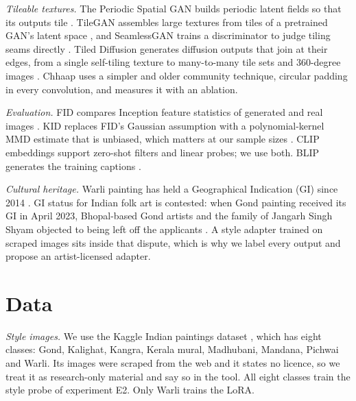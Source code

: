 \documentclass[conference]{IEEEtran}
\begin{document}
\textit{Tileable textures.} The Periodic Spatial GAN builds periodic latent fields so that its outputs tile \cite{bergmann2017psgan}. TileGAN assembles large textures from tiles of a pretrained GAN's latent space \cite{fruhstuck2019tilegan}, and SeamlessGAN trains a discriminator to judge tiling seams directly \cite{rodriguezpardo2022seamlessgan}. Tiled Diffusion generates diffusion outputs that join at their edges, from a single self-tiling texture to many-to-many tile sets and 360-degree images \cite{madar2025tiled}. Chhaap uses a simpler and older community technique, circular padding in every convolution, and measures it with an ablation.

\textit{Evaluation.} FID compares Inception feature statistics of generated and real images \cite{heusel2017fid}. KID replaces FID's Gaussian assumption with a polynomial-kernel MMD estimate that is unbiased, which matters at our sample sizes \cite{binkowski2018kid}. CLIP embeddings \cite{radford2021clip} support zero-shot filters and linear probes; we use both. BLIP generates the training captions \cite{li2022blip}.

\textit{Cultural heritage.} Warli painting has held a Geographical Indication (GI) since 2014 \cite{gi_warli}. GI status for Indian folk art is contested: when Gond painting received its GI in April 2023, Bhopal-based Gond artists and the family of Jangarh Singh Shyam objected to being left off the applicants \cite{pari_gond}. A style adapter trained on scraped images sits inside that dispute, which is why we label every output and propose an artist-licensed adapter.

\section{Data}

\textit{Style images.} We use the Kaggle Indian paintings dataset \cite{kaggle_indian_paintings}, which has eight classes: Gond, Kalighat, Kangra, Kerala mural, Madhubani, Mandana, Pichwai and Warli. Its images were scraped from the web and it states no licence, so we treat it as research-only material and say so in the tool. All eight classes train the style probe of experiment E2. Only Warli trains the LoRA.
\end{document}
